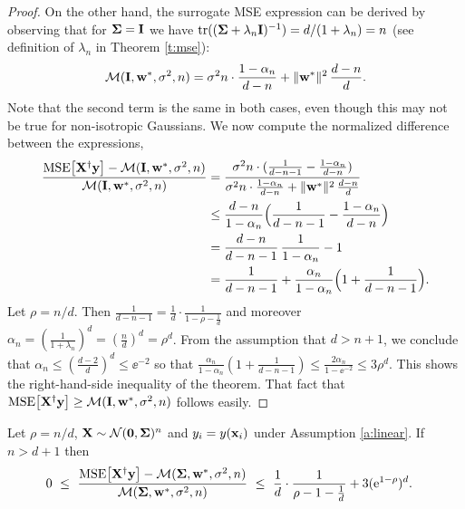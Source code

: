 \documentclass[11pt]{article}
\begin{document}
\begin{proof}
  On the other hand, the surrogate MSE expression can be derived by
observing that for $\mathbf{\Sigma}=\mathbf I$ we have
$\mathrm{tr}((\mathbf{\Sigma}+\lambda_n\mathbf I)^{-1})=d/(1+\lambda_n)=n$ (see definition of
$\lambda_n$ in Theorem \ref{t:mse}): 
  \begin{align*}
    \mathcal M(\mathbf I, \mathbf w^*,\sigma^2,n) =
    \sigma^2n\cdot\frac{1-\alpha_n}{d-n} + \|\mathbf w^*\|^2\,\frac{d-n}{d}.
  \end{align*}
  Note that the second term is the same in both cases, even though
  this may not be true for non-isotropic Gaussians. We now compute the
  normalized difference between the 
  expressions, 
  \begin{align*}
 \frac{{\mathrm{MSE}\big[\mathbf X^\dagger\mathbf y\big]}-\mathcal M(\mathbf I, \mathbf w^*,\sigma^2,n)}{\mathcal M(\mathbf I,
    \mathbf w^*,\sigma^2,n)}
    &= \frac{\sigma^2n\cdot(\frac1{d-n-1} -
    \frac{1-\alpha_n}{d-n})}{\sigma^2n\cdot\frac{1-\alpha_n}{d-n} +
    \|\mathbf w^*\|^2\,\frac{d-n}{d}}\\
&\leq \frac {d-n}{1-\alpha_n}
\Big(\frac1{d-n-1}-\frac{1-\alpha_n}{d-n}\Big)\\
    &=\frac{d-n}{d-n-1}\,\frac{1}{1-\alpha_n}- 1\\
    &=\frac1{d-n-1} + \frac{\alpha_n}{1-\alpha_n}\Big(1+\frac1{d-n-1}\Big).
  \end{align*}
Let $\rho=n/d$. Then $\frac1{d-n-1} = \frac1d\cdot
\frac1{1-\rho-\frac1d}$ and moreover
$\alpha_n = (\frac1{1+\lambda_n})^d=(\frac
nd)^d=\rho^d$. From the assumption that $d>n+1$, we
conclude that $\alpha_n \leq (\frac{d-2}{d})^d\leq \ee^{-2}$
so that $\frac{\alpha_n}{1-\alpha_n}(1+\frac1{d-n-1})\leq
  \frac{2 \alpha_n}{1-\ee^{-2}}\leq 3\rho^d$. This shows the right-hand-side inequality of the
  theorem. That fact that ${\mathrm{MSE}\big[\mathbf X^\dagger\mathbf y\big]}\geq\mathcal M(\mathbf I,
  \mathbf w^*,\sigma^2,n)$ follows easily.
\end{proof}
\begin{lemma}\label{l:asymptotic-over}
Let $\rho=n/d$, $\mathbf X\sim \mathcal{N}(\mathbf 0,\mathbf{\Sigma})^n$ and $y_i=y(\mathbf x_i)$ under Assumption
  \ref{a:linear}. If $n>d+1$ then
  \begin{align*}
    &0\ \leq\ \frac{{\mathrm{MSE}\big[\mathbf X^\dagger\mathbf y\big]}-\mathcal M(\mathbf{\Sigma},
\mathbf w^*,\sigma^2,n)}{\mathcal M(\mathbf{\Sigma},\mathbf w^*,\sigma^2,n)}\ \leq\
\frac1d\cdot \frac{1}{\rho-1-\frac1d} + 3(\mathrm{e}^{1-\rho})^d.
  \end{align*}
\end{lemma}
\end{document}
